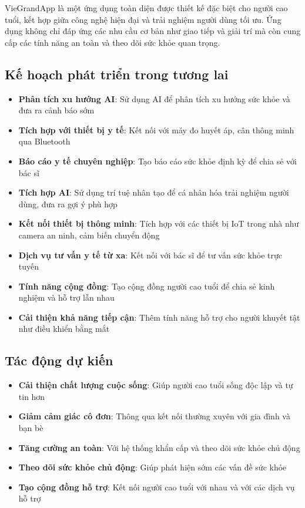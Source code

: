 \documentclass[12pt,a4paper]{article}
\begin{document}
VieGrandApp là một ứng dụng toàn diện được thiết kế đặc biệt cho người cao tuổi, kết hợp giữa công nghệ hiện đại và trải nghiệm người dùng tối ưu. Ứng dụng không chỉ đáp ứng các nhu cầu cơ bản như giao tiếp và giải trí mà còn cung cấp các tính năng an toàn và theo dõi sức khỏe quan trọng.

\subsection{Kế hoạch phát triển trong tương lai}
\begin{itemize}[leftmargin=2cm]

    \item \textbf{Phân tích xu hướng AI}: Sử dụng AI để phân tích xu hướng sức khỏe và đưa ra cảnh báo sớm
    \item \textbf{Tích hợp với thiết bị y tế}: Kết nối với máy đo huyết áp, cân thông minh qua Bluetooth
    \item \textbf{Báo cáo y tế chuyên nghiệp}: Tạo báo cáo sức khỏe định kỳ để chia sẻ với bác sĩ
    \item \textbf{Tích hợp AI}: Sử dụng trí tuệ nhân tạo để cá nhân hóa trải nghiệm người dùng, đưa ra gợi ý phù hợp
    \item \textbf{Kết nối thiết bị thông minh}: Tích hợp với các thiết bị IoT trong nhà như camera an ninh, cảm biến chuyển động
    \item \textbf{Dịch vụ tư vấn y tế từ xa}: Kết nối với bác sĩ để tư vấn sức khỏe trực tuyến
    \item \textbf{Tính năng cộng đồng}: Tạo cộng đồng người cao tuổi để chia sẻ kinh nghiệm và hỗ trợ lẫn nhau
    \item \textbf{Cải thiện khả năng tiếp cận}: Thêm tính năng hỗ trợ cho người khuyết tật như điều khiển bằng mắt
\end{itemize}

\subsection{Tác động dự kiến}
\begin{itemize}[leftmargin=2cm]
    \item \textbf{Cải thiện chất lượng cuộc sống}: Giúp người cao tuổi sống độc lập và tự tin hơn
    \item \textbf{Giảm cảm giác cô đơn}: Thông qua kết nối thường xuyên với gia đình và bạn bè
    \item \textbf{Tăng cường an toàn}: Với hệ thống khẩn cấp và theo dõi sức khỏe chủ động
    \item \textbf{Theo dõi sức khỏe chủ động}: Giúp phát hiện sớm các vấn đề sức khỏe
    \item \textbf{Tạo cộng đồng hỗ trợ}: Kết nối người cao tuổi với nhau và với các dịch vụ hỗ trợ
\end{itemize}
\end{document}
